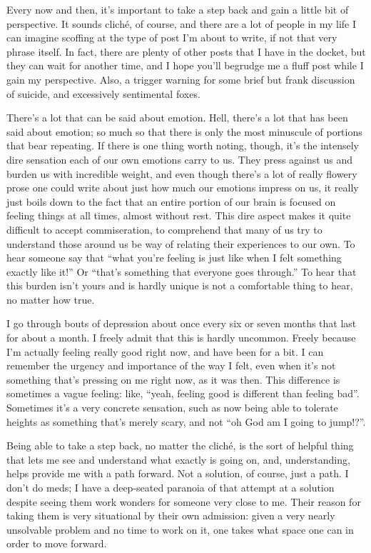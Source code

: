 
Every now and then, it's important to take a step back and gain a little bit of perspective. It sounds cliché, of course, and there are a lot of people in my life I can imagine scoffing at the type of post I'm about to write, if not that very phrase itself. In fact, there are plenty of other posts that I have in the docket, but they can wait for another time, and I hope you'll begrudge me a fluff post while I gain my perspective. Also, a trigger warning for some brief but frank discussion of suicide, and excessively sentimental foxes.

There's a lot that can be said about emotion. Hell, there's a lot that has been said about emotion; so much so that there is only the most minuscule of portions that bear repeating. If there is one thing worth noting, though, it's the intensely dire sensation each of our own emotions carry to us. They press against us and burden us with incredible weight, and even though there's a lot of really flowery prose one could write about just how much our emotions impress on us, it really just boils down to the fact that an entire portion of our brain is focused on feeling things at all times, almost without rest. This dire aspect makes it quite difficult to accept commiseration, to comprehend that many of us try to understand those around us be way of relating their experiences to our own. To hear someone say that ``what you're feeling is just like when I felt something exactly like it!'' Or ``that's something that everyone goes through.'' To hear that this burden isn't yours and is hardly unique is not a comfortable thing to hear, no matter how true.

I go through bouts of depression about once every six or seven months that last for about a month. I freely admit that this is hardly uncommon. Freely because I'm actually feeling really good right now, and have been for a bit. I can remember the urgency and importance of the way I felt, even when it's not something that's pressing on me right now, as it was then. This difference is sometimes a vague feeling: like, ``yeah, feeling good is different than feeling bad''. Sometimes it's a very concrete sensation, such as now being able to tolerate heights as something that's merely scary, and not ``oh God am I going to jump!?''.

Being able to take a step back, no matter the cliché, is the sort of helpful thing that lets me see and understand what exactly is going on, and, understanding, helps provide me with a path forward. Not a solution, of course, just a path. I don't do meds; I have a deep-seated paranoia of that attempt at a solution despite seeing them work wonders for someone very close to me. Their reason for taking them is very situational by their own admission: given a very nearly unsolvable problem and no time to work on it, one takes what space one can in order to move forward.

